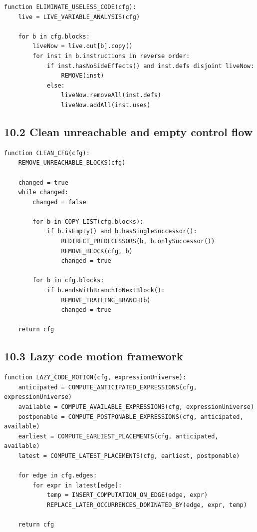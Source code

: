 \documentclass[10pt,letterpaper]{article}
\begin{document}
\begin{verbatim}
function ELIMINATE_USELESS_CODE(cfg):
    live = LIVE_VARIABLE_ANALYSIS(cfg)

    for b in cfg.blocks:
        liveNow = live.out[b].copy()
        for inst in b.instructions in reverse order:
            if inst.hasNoSideEffects() and inst.defs disjoint liveNow:
                REMOVE(inst)
            else:
                liveNow.removeAll(inst.defs)
                liveNow.addAll(inst.uses)
\end{verbatim}

\subsection*{10.2 Clean unreachable and empty control flow}
{}

\begin{verbatim}
function CLEAN_CFG(cfg):
    REMOVE_UNREACHABLE_BLOCKS(cfg)

    changed = true
    while changed:
        changed = false

        for b in COPY_LIST(cfg.blocks):
            if b.isEmpty() and b.hasSingleSuccessor():
                REDIRECT_PREDECESSORS(b, b.onlySuccessor())
                REMOVE_BLOCK(cfg, b)
                changed = true

        for b in cfg.blocks:
            if b.endsWithBranchToNextBlock():
                REMOVE_TRAILING_BRANCH(b)
                changed = true

    return cfg
\end{verbatim}

\subsection*{10.3 Lazy code motion framework}
{}

\begin{verbatim}
function LAZY_CODE_MOTION(cfg, expressionUniverse):
    anticipated = COMPUTE_ANTICIPATED_EXPRESSIONS(cfg, expressionUniverse)
    available = COMPUTE_AVAILABLE_EXPRESSIONS(cfg, expressionUniverse)
    postponable = COMPUTE_POSTPONABLE_EXPRESSIONS(cfg, anticipated, available)
    earliest = COMPUTE_EARLIEST_PLACEMENTS(cfg, anticipated, available)
    latest = COMPUTE_LATEST_PLACEMENTS(cfg, earliest, postponable)

    for edge in cfg.edges:
        for expr in latest[edge]:
            temp = INSERT_COMPUTATION_ON_EDGE(edge, expr)
            REPLACE_LATER_OCCURRENCES_DOMINATED_BY(edge, expr, temp)

    return cfg
\end{verbatim}
\end{document}
